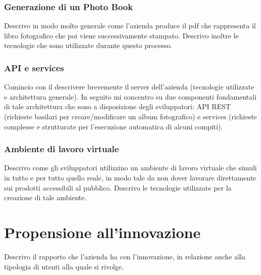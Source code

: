 			\subsubsection{Generazione di un Photo Book}
				Descrivo in modo molto generale come l'azienda produce il pdf che rappresenta il libro fotografico che poi viene
				successivamente stampato. Descrivo inoltre le tecnologie che sono utilizzate durante questo processo.
			\subsubsection{API e services}
				Comincio con il descrivere brevemente il server dell'azienda (tecnologie utilizzate e architettura generale). In
				seguito mi concentro su due componenti fondamentali di tale architettura che sono a disposizione degli sviluppatori:
				API REST (richieste basilari per creare/modificare un album fotografico) e services (richieste complesse e
				strutturate per l'esecuzione automatica di alcuni compiti).
			\subsubsection{Ambiente di lavoro virtuale}
				Descrivo come gli sviluppatori utilizzino un ambiente di lavoro virtuale che simuli in tutto e per tutto quello
				reale, in modo tale da non dover lavorare direttamente sui prodotti accessibili al pubblico. Descrivo le tecnologie
				utilizzate per la creazione di tale ambiente.
	\section{Propensione all'innovazione}
		Descrivo il rapporto che l'azienda ha con l'innovazione, in relazione anche alla tipologia di utenti alla quale si rivolge.
